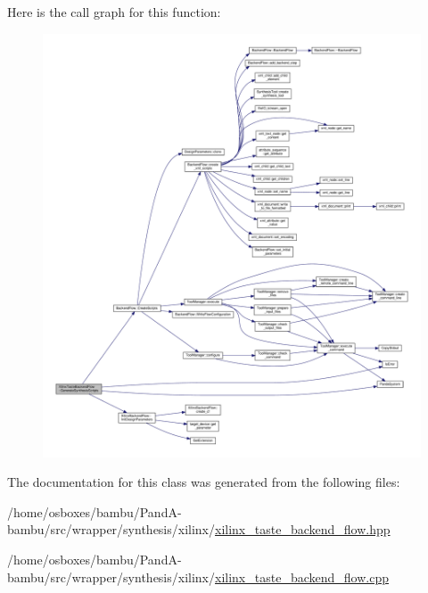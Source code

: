 Here is the call graph for this function\+:
\nopagebreak
\begin{figure}[H]
\begin{center}
\leavevmode
\includegraphics[width=350pt]{da/dd3/classXilinxTasteBackendFlow_a8f8760e798f045aaad6cc3b56a00e627_cgraph}
\end{center}
\end{figure}


The documentation for this class was generated from the following files\+:\begin{DoxyCompactItemize}
\item 
/home/osboxes/bambu/\+Pand\+A-\/bambu/src/wrapper/synthesis/xilinx/\hyperlink{xilinx__taste__backend__flow_8hpp}{xilinx\+\_\+taste\+\_\+backend\+\_\+flow.\+hpp}\item 
/home/osboxes/bambu/\+Pand\+A-\/bambu/src/wrapper/synthesis/xilinx/\hyperlink{xilinx__taste__backend__flow_8cpp}{xilinx\+\_\+taste\+\_\+backend\+\_\+flow.\+cpp}\end{DoxyCompactItemize}
